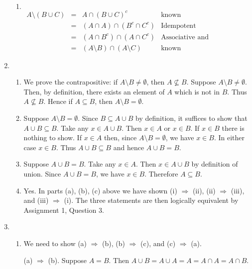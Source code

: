 \documentclass[12 pt]{article}
\begin{document}
\begin{enumerate}
\begin{enumerate}
 \item
$ $\\
$\begin{array}{rcll}
A \setminus (B \cup C) &=& A \cap (B \cup C)^c & \mbox{known}\\
&=& (A \cap A) \cap (B^c \cap C^c) & \mbox{Idempotent}\\
&=& (A \cap B^c) \cap (A \cap C^c) & \mbox{Associative and Commutative (several times)}\\
&=& (A \setminus B) \cap (A \setminus C) & \mbox{known}
\end{array}$
\end{enumerate}

\item \begin{enumerate}
\item 
We prove the contrapositive: if $A \setminus B \neq \emptyset$, then $A \not\subseteq B$.
Suppose $A \setminus B \neq \emptyset$.
Then, by definition, there exists an element of $A$ which is not in $B$.
Thus $A \not\subseteq B$.
Hence if $A \subseteq B$, then $A \setminus B = \emptyset$.
 
 \item  Suppose $A \setminus B = \emptyset$.
 Since $B \subseteq A \cup B$ by definition, it suffices to show that $A \cup B \subseteq B$.
 Take any $x \in A \cup B$.
 Then $x \in A$ or $x \in B$.
 If $x \in B$ there is nothing to show.
 If $x \in A$ then,  since $A \setminus B = \emptyset$, we have $x \in B$.
 In either case $x \in B$.
 Thus $A \cup B \subseteq B$ and hence $A \cup B = B$.
 
 \item Suppose $A \cup B = B$.
 Take any $x \in A$.
 Then $x \in A \cup B$ by definition of union.
 Since $A \cup B = B$, we have $x \in B$.
 Therefore $A \subseteq B$.
 
 \item Yes.  In parts (a), (b), (c) above we have shown (i) $\Rightarrow$ (ii),  (ii) $\Rightarrow$ (iii), and (iii) $\Rightarrow$ (i).
 The three statements are then logically equivalent by Assignment 1, Question 3.
 \end{enumerate}
 
 \item\begin{enumerate}
 \item We need to show (a) $\Rightarrow$ (b), (b) $\Rightarrow$ (c), and (c) $\Rightarrow$ (a).
 
 \smallskip
(a) $\Rightarrow$ (b). Suppose $A = B$.  Then $A \cup B = A \cup A = A = A \cap A = A \cap B$.


\end{enumerate}
\end{enumerate}
\end{document}

